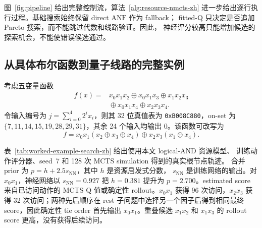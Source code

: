 \documentclass[UTF8,fontset=fandol,11pt]{ctexart}
\newcommand{\anf}{\ensuremath{\mathrm{ANF}}}
\newcommand{\xor}{\ensuremath{\oplus}}
\begin{document}
图~\ref{fig:pipeline} 给出完整控制流，算法~\ref{alg:resource-nmcts-zh}
进一步给出逐行执行过程。基础搜索始终保留 direct \anf{} 作为 fallback；
fitted-Q 只决定是否追加 Pareto 搜索，而不能跳过代数和线路验证。因此，
神经评分较高只能增加候选的探索机会，不能使错误候选通过。



\subsection{从具体布尔函数到量子线路的完整实例}
\label{sec:worked-example-zh}

考虑五变量函数
\begin{equation}
\begin{split}
f(x)={}&x_0x_1x_2\xor x_0x_1x_3\xor x_1x_2x_3\\
      &{}\xor x_0x_1x_4\xor x_2x_3x_4 .
\end{split}
\label{eq:worked-example-anf-zh}
\end{equation}
令输入编号为 $j=\sum_{i=0}^{4}2^i x_i$，则其 32 位真值表为
\texttt{0xB008C880}，on-set 为
$\{7,11,14,15,19,28,29,31\}$，其余 24 个输入均输出 0。该函数可改写为
\begin{equation}
f=x_0x_1(x_2\xor x_3\xor x_4)
  \xor x_2x_3(x_1\xor x_4).
\label{eq:worked-example-factor-zh}
\end{equation}

表~\ref{tab:worked-example-search-zh} 给出使用本文 logical-AND 资源模型、
训练动作评分器、seed~7 和 128 次 MCTS simulation 得到的真实根节点轨迹。
合并 prior 为 $p=h+2.5s_{\mathrm{NN}}$，其中 $h$ 是资源启发式分数，
$s_{\mathrm{NN}}$ 是训练网络的输出。对 $x_0x_1$，神经网络以
$s_{\mathrm{NN}}=0.927$ 把 $h=0.381$ 提升为 $p=2.700$。estimated score
来自已访问动作的 MCTS Q 值或确定性 rollout。$x_0x_1$ 获得 96 次访问，$x_2x_3$ 获得
32 次访问；两种先后顺序在 rest 子问题中选择另一个因子后得到相同最终
score，因此确定性 tie order 首先输出 $x_0x_1$。重叠候选 $x_1x_2$ 和
$x_1x_3$ 的 rollout score 更高，没有获得后续访问。

\begin{table}[htbp]
\centering
\scriptsize
\setlength{\tabcolsep}{2.5pt}
\renewcommand{\arraystretch}{1.06}
\caption{式~\eqref{eq:worked-example-anf-zh} 的根节点搜索轨迹。粗体为首先
输出的因子；Combined 为 $h+2.5s_{\mathrm{NN}}$，estimated score 越低越好。}
\label{tab:worked-example-search-zh}

\end{table}
\end{document}
